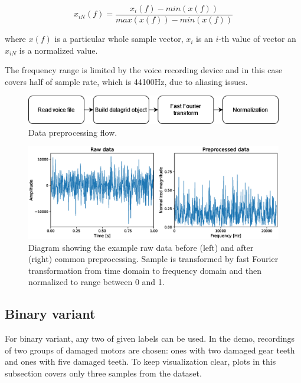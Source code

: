 \documentclass[energies,article,submit,pdftex,moreauthors]{Definitions/mdpi}
\begin{document}
\begin{linenomath}
\begin{equation}
x_{iN}(f) = \frac{x_i(f) - min(x(f))}{max(x(f)) - min(x(f))}
\end{equation}
\end{linenomath}
where $x(f)$ is a particular whole sample vector, $x_i$ is an $i$-th value of vector an $x_{iN}$ is a normalized value.

The frequency range is limited by the voice recording device and in this case covers half of sample rate, which is 44100Hz, due to aliasing issues.

\vspace{5mm}
\begin{figure}[H]
\includegraphics[width=\textwidth]{images/preprocessing_flow}
\caption{Data preprocessing flow.}
\end{figure}
\unskip
\vspace{5mm}

\begin{figure}[H]
\includegraphics[width=\textwidth]{images/common_preprocessing}
\caption{Diagram showing the example raw data before (left) and after (right) common preprocessing. Sample is transformed by fast Fourier transformation from time domain to frequency domain and then normalized to range between 0 and 1.}
\end{figure}
\unskip
\vspace{5mm}

\subsection{Binary variant}

For binary variant, any two of given labels can be used. In the demo, recordings of two groups of damaged motors are chosen: ones with two damaged gear teeth and ones with five damaged teeth. To keep visualization clear, plots in this subsection covers only three samples from the dataset.
\end{document}
